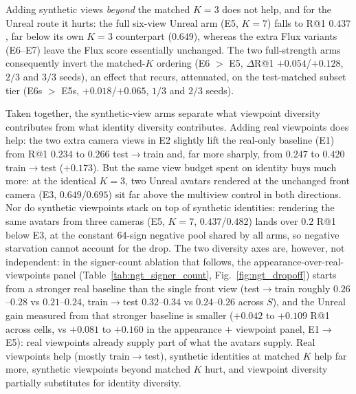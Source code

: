 Adding synthetic views \emph{beyond} the matched $K{=}3$ does not help, and for
the Unreal route it hurts: the full six-view Unreal arm (E5, $K{=}7$) falls to
R@1 $0.437$, far below its own $K{=}3$ counterpart ($0.649$), whereas the extra
Flux variants (E6--E7) leave the Flux score essentially unchanged. The two
full-strength arms consequently invert the matched-$K$ ordering (E6 $>$ E5,
$\Delta$R@1 $+0.054$/$+0.128$, $2/3$ and $3/3$ seeds), an effect that recurs,
attenuated, on the test-matched subset tier (E6s $>$ E5s, $+0.018$/$+0.065$,
$1/3$ and $2/3$ seeds).

Taken together, the synthetic-view arms separate what viewpoint
diversity contributes from what identity diversity contributes. Adding real
viewpoints does help: the two extra camera views in E2 slightly lift the real-only
baseline (E1) from R@1 $0.234$ to $0.266$ test$\to$train and, far more sharply, from
$0.247$ to $0.420$ train$\to$test ($+0.173$). But the same view budget spent on
identity buys much more: at the identical $K{=}3$, two Unreal avatars
rendered at the unchanged front camera (E3, $0.649$/$0.695$) sit far above the
multiview control in both directions. Nor do synthetic viewpoints stack on
top of synthetic identities: rendering the same avatars from three cameras
(E5, $K{=}7$, $0.437$/$0.482$) lands over $0.2$ R@1 below E3, at
the constant 64-sign negative pool shared by all arms, so negative
starvation cannot account for the drop. The two diversity axes are, however,
not independent: in the signer-count ablation that follows, the
appearance-over-real-viewpoints panel (Table~\ref{tab:ngt_signer_count},
Fig.~\ref{fig:ngt_dropoff}) starts from a stronger real baseline than the
single front view (test$\to$train roughly $0.26$--$0.28$ vs $0.21$--$0.24$, train$\to$test
$0.32$--$0.34$ vs $0.24$--$0.26$ across $S$), and the Unreal gain measured from that
stronger baseline is smaller ($+0.042$ to $+0.109$ R@1 across cells, vs $+0.081$
to $+0.160$ in the appearance $+$ viewpoint panel, E1$\to$E5): real viewpoints already supply part of what the
avatars supply. Real
viewpoints help (mostly train$\to$test), synthetic identities at matched $K$ help
far more, synthetic viewpoints beyond matched $K$ hurt, and viewpoint
diversity partially substitutes for identity diversity.


